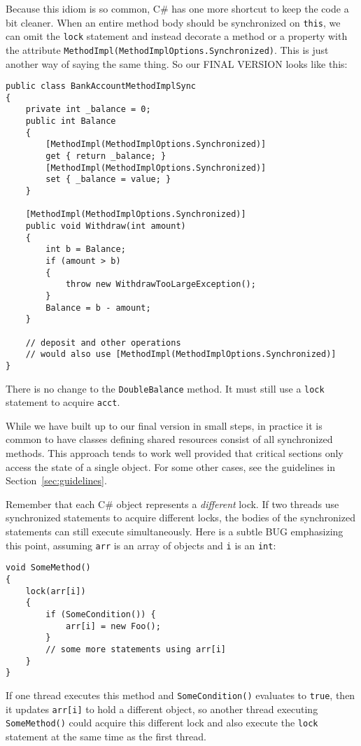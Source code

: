 \documentclass[10pt]{article}
\begin{document}
Because this idiom is so common, C\# has one more shortcut to keep 
the code a bit cleaner.  When an entire method body should be
synchronized on {\tt this}, we can omit the {\tt lock} statement and
instead decorate a method or a property with the attribute 
{\tt MethodImpl(MethodImplOptions.Synchronized)}.  This is just another 
way of saying the same thing.  So our FINAL VERSION looks like this:
\begin{verbatim}
public class BankAccountMethodImplSync
{
    private int _balance = 0;
    public int Balance
    {
        [MethodImpl(MethodImplOptions.Synchronized)]
        get { return _balance; }
        [MethodImpl(MethodImplOptions.Synchronized)]
        set { _balance = value; }
    }

    [MethodImpl(MethodImplOptions.Synchronized)]
    public void Withdraw(int amount)
    {
        int b = Balance;
        if (amount > b)
        {
            throw new WithdrawTooLargeException();
        }
        Balance = b - amount;
    }
    
    // deposit and other operations
    // would also use [MethodImpl(MethodImplOptions.Synchronized)]
}
\end{verbatim}
There is no change to the {\tt DoubleBalance} method.  It must still
use a {\tt lock} statement to acquire {\tt acct}.

While we have built up to our final version in small steps, in
practice it is common to have classes defining shared resources
consist of all synchronized methods.  This approach tends to work well
provided that critical sections only access the state of a single
object.  For some other cases, see the guidelines in
Section~\ref{sec:guidelines}.

Remember that each C\# object represents a \emph{different} lock.  If
two threads use synchronized statements to acquire different locks,
the bodies of the synchronized statements can still execute
simultaneously.  Here is a subtle BUG emphasizing this point, assuming
{\tt arr} is an array of objects and {\tt i} is an {\tt int}:
\begin{verbatim}
void SomeMethod()
{
    lock(arr[i])
    {
        if (SomeCondition()) {
            arr[i] = new Foo();
        }
        // some more statements using arr[i]
    }
}
\end{verbatim}
If one thread executes this method and {\tt SomeCondition()} evaluates
to {\tt true}, then it updates {\tt arr[i]} to hold a different
object, so another thread executing {\tt SomeMethod()} could acquire
this different lock and also execute the {\tt lock} statement at the same
time as the first thread.
\end{document}

